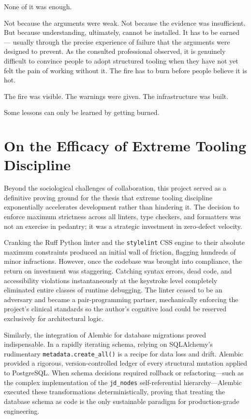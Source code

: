 \documentclass[11pt,a4paper]{book}
\begin{document}
None of it was enough.

Not because the arguments were weak. Not because the evidence was insufficient. But because understanding, ultimately, cannot be installed. It has to be earned --- usually through the precise experience of failure that the arguments were designed to prevent. As the consulted professional observed, it is genuinely difficult to convince people to adopt structured tooling when they have not yet felt the pain of working without it. The fire has to burn before people believe it is hot.

The fire was visible. The warnings were given. The infrastructure was built.

Some lessons can only be learned by getting burned.

\section{On the Efficacy of Extreme Tooling Discipline}

Beyond the sociological challenges of collaboration, this project served as a definitive proving ground for the thesis that extreme tooling discipline exponentially accelerates development rather than hindering it. The decision to enforce maximum strictness across all linters, type checkers, and formatters was not an exercise in pedantry; it was a strategic investment in zero-defect velocity.

Cranking the Ruff Python linter and the \texttt{stylelint} CSS engine to their absolute maximum constraints produced an initial wall of friction, flagging hundreds of minor infractions. However, once the codebase was brought into compliance, the return on investment was staggering. Catching syntax errors, dead code, and accessibility violations instantaneously at the keystroke level completely eliminated entire classes of runtime debugging. The linter ceased to be an adversary and became a pair-programming partner, mechanically enforcing the project's clinical standards so the author's cognitive load could be reserved exclusively for architectural logic.

Similarly, the integration of Alembic for database migrations proved indispensable. In a rapidly iterating schema, relying on SQLAlchemy's rudimentary \texttt{metadata.create\_all()} is a recipe for data loss and drift. Alembic provided a rigorous, version-controlled ledger of every structural mutation applied to PostgreSQL. When schema decisions required rollback or refactoring---such as the complex implementation of the \texttt{jd\_nodes} self-referential hierarchy---Alembic executed these transformations deterministically, proving that treating the database schema as code is the only sustainable paradigm for production-grade engineering.
\end{document}
